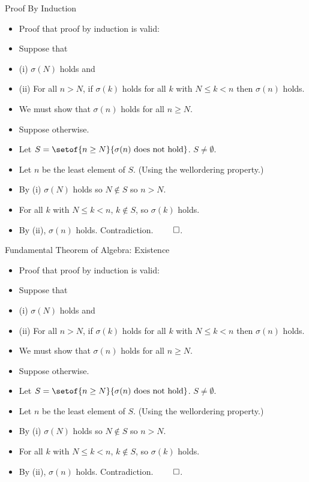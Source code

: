 \documentclass{beamer}
\begin{document}
\begin{frame}{Proof By Induction}

\begin{itemize}
  \item Proof that proof by induction is valid:
  \item Suppose that
  \item (i) $\sigma(N)$ holds and
  \item (ii) For all $n>N$, if $\sigma(k)$ holds for all $k$ with $N\leq k < n$ then $\sigma(n)$ holds.
  \item We must show that $\sigma(n)$ holds for all $n\geq N$.
  \item Suppose otherwise.
  \item Let $S=\setof{n\geq N}{\sigma(n)\text{ does not hold}}$. $S\not=\emptyset$.
  \item Let $n$ be the least element of $S$. (Using the wellordering property.)
  \item By (i) $\sigma(N)$ holds so $N\notin S$ so $n>N$.
  \item For all $k$ with $N\leq k < n$, $k\notin S$, so $\sigma(k)$ holds.
  \item By (ii), $\sigma(n)$ holds. Contradiction. $\qed$.
\end{itemize}

\end{frame}

\begin{frame}{Fundamental Theorem of Algebra: Existence}

\begin{itemize}
  \item Proof that proof by induction is valid:
  \item Suppose that
  \item (i) $\sigma(N)$ holds and
  \item (ii) For all $n>N$, if $\sigma(k)$ holds for all $k$ with $N\leq k < n$ then $\sigma(n)$ holds.
  \item We must show that $\sigma(n)$ holds for all $n\geq N$.
  \item Suppose otherwise.
  \item Let $S=\setof{n\geq N}{\sigma(n)\text{ does not hold}}$. $S\not=\emptyset$.
  \item Let $n$ be the least element of $S$. (Using the wellordering property.)
  \item By (i) $\sigma(N)$ holds so $N\notin S$ so $n>N$.
  \item For all $k$ with $N\leq k < n$, $k\notin S$, so $\sigma(k)$ holds.
  \item By (ii), $\sigma(n)$ holds. Contradiction. $\qed$.
\end{itemize}

\end{frame}
\end{document}
